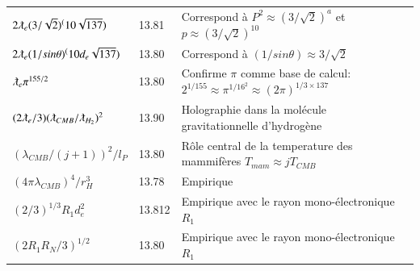 \documentclass[a4paper,9pt]{article}
\begin{document}
\begin{table}
\begin{tabular}{llll}
 $ 2 \lambdabar_{e} (3/\sqrt2)^(10\sqrt {137}) $ & 13.81 & Correspond à $P^2 \approx (3/\sqrt2)^a$ et $p\approx (3/\sqrt2)^{10}$     \\ 
 $ 2 \lambdabar_{e} (1/sin\theta)^(10d_e\sqrt {137}) $ & 13.80 & Correspond à $(1/sin\theta) \approx 3/\sqrt2$   \\ 
 
 
 
 $ \lambdabar_{e} \pi^{155/2}$ & 13.80 & Confirme $\pi$ comme base de calcul: $2^{1/155} \approx \pi^{1/16^2}  \approx (2\pi)^{1/3\times 137} $  \\
 
 $ (2\lambdabar_{e}/3) (\lambdabar_{CMB}/\lambdabar_{H_2})^2$ & 13.90 &  Holographie dans la molécule gravitationnelle d'hydrogène \\
   
   $ (\lambda_{CMB}/(j+1))^2/l_P$ & 13.80 &  Rôle central de la temperature des mammifères $T_{mam}\approx j T_{CMB} $ \\
   
   $ (4\pi \lambda_{CMB})^4/r_H^3$ & 13.78 &  Empirique \\
   
   $(2/3)^{1/3}R_1 d_e^2$  & 13.812    & Empirique avec le rayon mono-électronique $R_1$ \\
 
 $(2R_1R_N/3)^{1/2}$  & 13.80    & Empirique avec le rayon mono-électronique $R_1$ \\
 
  
  
  
  
 
 
 
   
   
   
   

\end{tabular}
\end{table}
\end{document}
